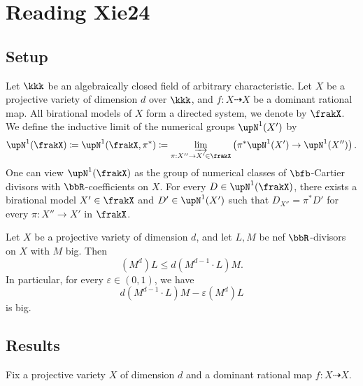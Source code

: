 \section{Reading Xie24}


\subsection{Setup}

  Let $\kkk$ be an algebraically closed field of arbitrary characteristic.
  Let $X$ be a projective variety of dimension $d$ over $\kkk$, and $f: X \dashrightarrow X$ be a dominant rational map.
  All birational models of $X$ form a directed system, we denote by $\frakX$.
  We define the inductive limit of the numerical groups $\upN^1(X')$ by 
  \[ \upN^1(\frakX) \coloneqq \upN^1(\frakX,\pi^*) \coloneqq \varinjlim_{\pi:X'' \to X' \in \frakX} \left( \pi^* \upN^1(X') \to \upN^1(X'') \right). \]
  One can view $\upN^1(\frakX)$ as the group of numerical classes of $\bfb$-Cartier divisors with $\bbR$-coefficients on $X$.
  For every $D \in \upN^1(\frakX)$, there exists a birational model $X' \in \frakX$ and $D' \in \upN^1(X')$ such that $D_{X''} = \pi^* D'$ for every $\pi: X'' \to X'$ in $\frakX$.
  
  

  \begin{theorem}
    Let $X$ be a projective variety of dimension $d$, and let $L,M$ be nef $\bbR$-divisors on $X$ with $M$ big. 
    Then 
    \[ (M^d) L \leq d (M^{d-1} \cdot L) M. \]
    In particular, for every $\varepsilon \in (0, 1)$, we have
    \[ d (M^{d-1} \cdot L) M - \varepsilon (M^d) L \]
    is big.
  \end{theorem}

\subsection{Results}

  Fix a projective variety $X$ of dimension $d$ and a dominant rational map $f: X \dashrightarrow X$. 


